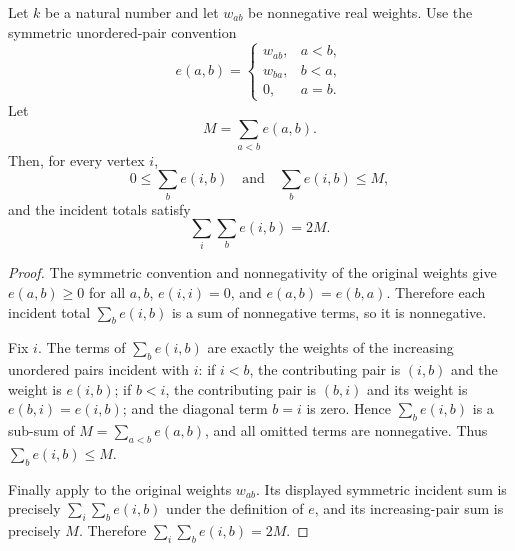 \begin{helper}
Let $k$ be a natural number and let $w_{ab}$ be nonnegative real weights.
Use the symmetric unordered-pair convention
\[
e(a,b)=
\begin{cases}
w_{ab},&a<b,\\
w_{ba},&b<a,\\
0,&a=b.
\end{cases}
\]
Let
\[
M=\sum_{a<b} e(a,b).
\]
Then, for every vertex $i$,
\[
0\le \sum_b e(i,b)
\quad\text{and}\quad
\sum_b e(i,b)\le M,
\]
and the incident totals satisfy
\[
\sum_i\sum_b e(i,b)=2M.
\]
\end{helper}
\begin{proof}
The symmetric convention and nonnegativity of the original weights give
$e(a,b)\ge 0$ for all $a,b$, $e(i,i)=0$, and $e(a,b)=e(b,a)$.
Therefore each incident total $\sum_b e(i,b)$ is a sum of nonnegative
terms, so it is nonnegative.

Fix $i$.  The terms of $\sum_b e(i,b)$ are exactly the weights of the
increasing unordered pairs incident with $i$: if $i<b$, the contributing
pair is $(i,b)$ and the weight is $e(i,b)$; if $b<i$, the contributing
pair is $(b,i)$ and its weight is $e(b,i)=e(i,b)$; and the diagonal term
$b=i$ is zero.  Hence $\sum_b e(i,b)$ is a sub-sum of
$M=\sum_{a<b}e(a,b)$, and all omitted terms are nonnegative.  Thus
$\sum_b e(i,b)\le M$.

Finally apply  to the original
weights $w_{ab}$.  Its displayed symmetric incident sum is precisely
$\sum_i\sum_b e(i,b)$ under the definition of $e$, and its increasing-pair
sum is precisely $M$.  Therefore
$\sum_i\sum_b e(i,b)=2M$.
\end{proof}
